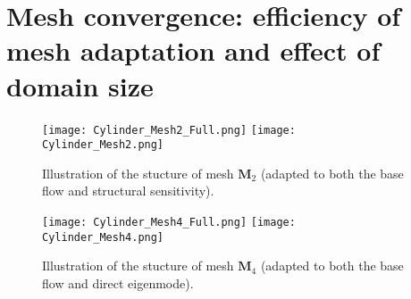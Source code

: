 \documentclass[twocolumn,10pt]{asme2ej}
\begin{document}







\section{Mesh convergence: efficiency of mesh adaptation and effect of domain size}
\begin{figure}
\texttt{[image: Cylinder\_Mesh2\_Full.png]}
\texttt{[image: Cylinder\_Mesh2.png]}
\caption{Illustration of the stucture of mesh  $\mathbf{M}_2$ (adapted to both the base flow and structural sensitivity).}
\label{fig:mesh2}
\end{figure}

\begin{figure}
\texttt{[image: Cylinder\_Mesh4\_Full.png]}
\texttt{[image: Cylinder\_Mesh4.png]}
\caption{Illustration of the stucture of mesh  $\mathbf{M}_4$ (adapted to both the base flow and direct eigenmode).}
\label{fig:mesh4}
\end{figure}
\end{document}
